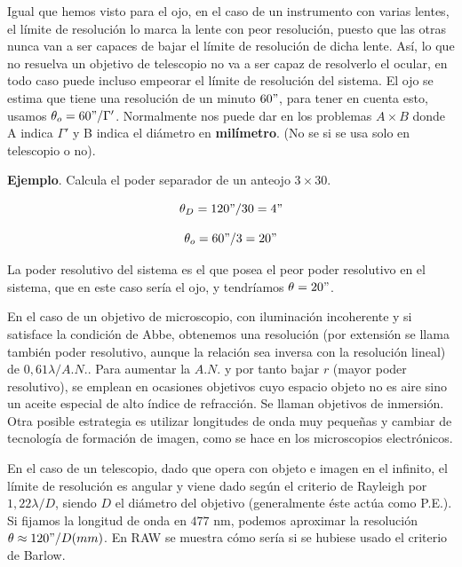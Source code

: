 \documentclass[12pt,a4paper]{report}
\newcommand{\esp}{\vspace{0.5cm}}
\begin{document}
	\esp
	
	Igual que hemos visto para el ojo, en el caso de un instrumento con varias lentes, el límite de resolución lo marca la lente con peor resolución, puesto que las otras nunca van a ser capaces de bajar el límite de resolución de dicha lente. Así, lo que no resuelva un objetivo de telescopio no va a ser capaz de resolverlo el ocular, en todo caso puede incluso empeorar el límite de resolución del sistema. El ojo se estima que tiene una resolución de un minuto $60"$, para tener en cuenta esto, usamos $\theta_o = 60"/ \Gamma '$. Normalmente nos puede dar en los problemas $A\times B$ donde A indica $\Gamma '$ y B indica el diámetro en \textbf{milímetro}. (No se si se usa solo en telescopio o no).
	
	\esp
	
	\noindent \textbf{Ejemplo}. Calcula el poder separador de un anteojo $3\times 30$.
	
	\esp
	
	\begin{equation*}
		\theta_D = 120"/30= 4"
	\end{equation*}
	
	\esp
	
	\begin{equation*}
		\theta_o = 60"/3 = 20"
	\end{equation*}
	
	La poder resolutivo del sistema es el que posea el peor poder resolutivo en el sistema, que en este caso sería el ojo, y tendríamos $\theta = 20"$.
	
	\esp
	
	En el caso de un objetivo de microscopio, con iluminación incoherente y si satisface la condición de Abbe, obtenemos una resolución (por extensión se llama también poder resolutivo, aunque la relación sea inversa con la resolución lineal) de $0,61\lambda / A.N.$. Para aumentar la $A.N.$ y por tanto bajar $r$ (mayor poder resolutivo), se emplean en ocasiones objetivos cuyo espacio objeto no es aire sino un aceite especial de alto índice de refracción. Se llaman objetivos de inmersión. Otra posible estrategia es utilizar longitudes de onda muy pequeñas y cambiar de tecnología de formación de imagen, como se hace en los microscopios electrónicos.
	
	\esp
	
	En el caso de un telescopio, dado que opera con objeto e imagen en el infinito, el límite de resolución es angular y viene dado según el criterio de Rayleigh por $1,22\lambda/D$, siendo $D$ el diámetro del objetivo (generalmente éste actúa como P.E.). Si fijamos la longitud de onda en $477$ nm, podemos aproximar la resolución $\theta \approx 120"/D(mm)$. En RAW se muestra cómo sería si se hubiese usado el criterio de Barlow.
	
\end{document}

